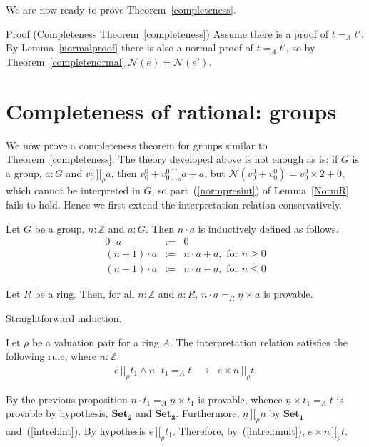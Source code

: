 \documentclass[numreferences]{kluwer}
\newcommand{\intII}{\,]\![}
\newcommand{\intrel}{\mathbin{\intII_{\rho}}}
\newcommand{\N}{\ensuremath{\mathcal{N}}}
\newcommand{\Z}{{\mathbb Z}}
\newcommand{\tacticname}[1]{\textsf{#1}}
\newcommand{\rational}{\tacticname{rational}}
\newcommand{\axiom}[1]{\ensuremath{\mathbf{#1}}}
\newcommand{\iter}[2]{\ensuremath{{#1}\cdot{#2}}}
\begin{document}
\begin{article}
We are now ready to prove Theorem~\ref{completeness}.

\begin{pf*}{Proof (Completeness Theorem~\ref{completeness})}
Assume there is a proof of $t=_A t'$.  By Lemma~\ref{normalproof} there is
also a normal proof of $t=_A t'$, so by Theorem~\ref{completenormal}
$\N(e)=\N(e')$.
\end{pf*}

\section{Completeness of {\rational}: groups}\label{groups}

We now prove a completeness theorem for groups similar
to Theorem~\ref{completeness}.
The theory developed above is not enough as is:
if $G$ is a group, $a:G$ and
$v^0_0\intrel a$, then $v^0_0+v^0_0\intrel a+a$, but
$\N(v^0_0+v^0_0)=v^0_0\times 2+0$, which cannot be interpreted in $G$,
so part~(\ref{normpresint}) of Lemma~\ref{NormR} fails to hold.
Hence we first extend the interpretation relation conservatively.

\begin{definition}\label{defn:iter} Let $G$ be a group, $n:\Z$ and $a:G$.
Then {\iter na} is inductively defined as follows.
\begin{eqnarray}
\label{iter:0}
 \iter0a & := & 0\\
\label{iter:pos}
 \iter{(n+1)}a & := & \iter na+a, \mbox{ for $n\geq 0$}\\
\label{iter:neg}
 \iter{(n-1)}a & := & \iter na-a, \mbox{ for $n\leq 0$}
\end{eqnarray}
\end{definition}

\begin{proposition} Let $R$ be a ring.  Then, for all $n:\Z$ and $a:R$,
$\iter na=_R \underline n\times a$ is provable.
\end{proposition}
\begin{pf}
Straightforward induction.
\end{pf}

\begin{lemma}\label{intrel:iterprop} Let $\rho$ be a valuation pair for
a ring $A$.  The interpretation relation satisfies the following rule,
where $n:\Z$.
\begin{eqnarray*}
e\intrel t_1 \wedge \iter n{t_1}=_A t & \rightarrow & e\times n\intrel t.
\end{eqnarray*}
\end{lemma}
\begin{pf} By the previous proposition
$\iter n{t_1}=_A \underline n\times t_1$ is provable, whence
$\underline n\times t_1=_A t$ is provable by hypothesis, \axiom{Set_2} and
\axiom{Set_3}.  Furthermore, $\underline n\intrel n$ by \axiom{Set_1}
and~(\ref{intrel:int}).  By hypothesis $e\intrel t_1$.  Therefore,
by~(\ref{intrel:mult}), $e\times n\intrel t$.
\end{pf}


\end{article}
\end{document}
